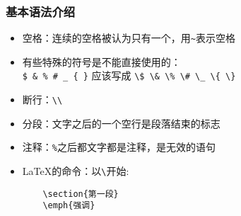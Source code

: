 \begin{frame}[fragile]\frametitle{基本语法介绍}
    \begin{itemize}
         \item 空格：连续的空格被认为只有一个，用\verb|~|表示空格
         \item 有些特殊的符号是不能直接使用的：\\
                    \verb|$ & % # _ { }|
                    应该写成
                    \verb|\$ \& \% \# \_ \{ \}|
         \item 断行：\verb|\\|
         \item 分段：文字之后的一个空行是段落结束的标志
         \item 注释：\verb|%|之后都文字都是注释，是无效的语句
         \item LaTeX的命令：以\verb|\|开始: \\
                    \begin{verbatim}
    \section{第一段}
    \emph{强调}
                   \end{verbatim}
    \end{itemize}
\end{frame}